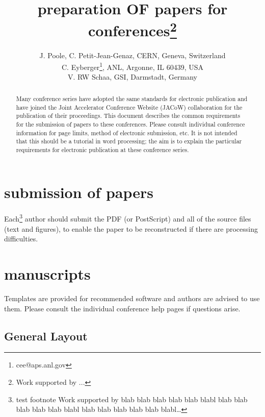 \documentclass[a4paper]{jacow}
\begin{document}
\title{preparation OF papers for  conferences\thanks{Work supported by ...}}

\author{J. Poole, C. Petit-Jean-Genaz, CERN, Geneva, Switzerland\\
        C. Eyberger\thanks{cee@aps.anl.gov}, ANL, Argonne, IL 60439, USA\\
        V. RW Schaa, GSI,  Darmstadt, Germany}

\maketitle

%
\begin{abstract}
   Many conference series have adopted the same standards for electronic
   publication and have joined the Joint Accelerator Conference Website (JACoW)
   collaboration for the publication of their proceedings.
   This document describes the common requirements for the submission of papers
   to these conferences. Please consult individual conference
   information for page limits, method of electronic submission, etc.
   It is not intended that this should be a tutorial in word processing;
   the aim is to explain the particular requirements for electronic publication
   at these conference series.
\end{abstract}

\section{submission of papers}
Each\footnote{test footnote Work supported by blab blab blab blab blab blabl blab blab blab blab blab blabl blab blab blab blab blab blabl\ldots} author should submit the PDF (or PostScript) and all of the source files (text and figures),
to enable the paper to be reconstructed if there are processing difficulties.

\section{manuscripts}
Templates are provided for recommended software and authors are
advised to use them. Please consult the individual conference help pages if questions
arise.

\subsection{General Layout}
\end{document}
